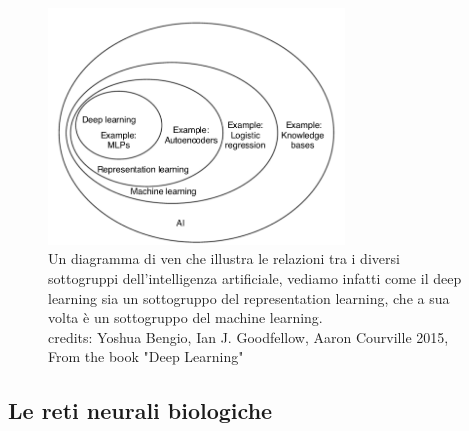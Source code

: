 \begin{figure}[H]
    \centering
    \includegraphics[width=0.7\textwidth]{imgs/AI_venn_diagram.png}
    \caption{Un diagramma di ven che illustra le relazioni tra i diversi sottogruppi dell'intelligenza artificiale, vediamo infatti come
    il deep learning sia un sottogruppo del representation learning, che a sua volta è un sottogruppo del machine learning.\\
    credits: Yoshua Bengio, Ian J. Goodfellow, Aaron Courville 2015, From the book "Deep Learning"\\}
    \label{fig:ai_venn_diagram}
\end{figure}

\subsection{Le reti neurali biologiche}

